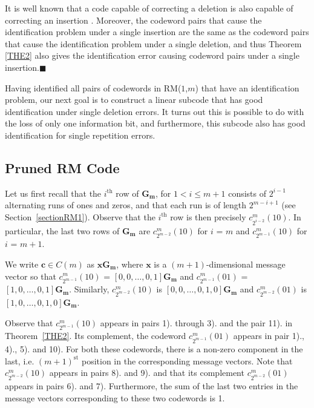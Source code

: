 \begin{remark}
It is well known that a code capable of correcting a deletion is
also capable of correcting an insertion \cite{lev:66}. Moreover,
the codeword pairs that cause the identification problem under a
single insertion are the same as the codeword pairs that cause the
identification problem under a single deletion, and thus Theorem
\ref{THE2} also gives the identification error causing codeword
pairs under a single insertion.\hfill$\blacksquare$
\end{remark}
Having identified all pairs of codewords in RM($1$,$m$) that have
an identification problem, our next goal is to construct a linear
subcode that has good identification under single deletion errors.
It turns out this is possible to do with the loss of only one
information bit, and furthermore, this subcode also has good
identification for single repetition errors.

\subsection{Pruned RM Code}\label{sectionprun}

Let us first recall that the $i^{\text{th}}$ row of $\mathbf{G_m}$,
for $1 <i \leq m+1$ consists of $2^{i-1}$ alternating runs of ones
and zeros, and that each run is of length $2^{m-i+1}$ (see
Section~\ref{sectionRM1}). Observe that the $i^{\text{th}}$ row is
then precisely $c_{2^{i-2}}^m(10)$. In particular, the last two rows
of $\mathbf{G_m}$ are $c_{2^{m-2}}^m(10)$ for $i$ = $m$ and
$c_{2^{m-1}}^m(10)$ for $i$ = $m+1$.

We write $\mathbf{c} \in C(m)$ as $\mathbf{x} \mathbf{G_m}$, where
$\mathbf{x}$ is a $(m+1)$-dimensional message vector so that
$c_{2^{m-1}}^m(10)$ = $[0,0,\ldots,0,1] \mathbf{G_m}$ and
$c_{2^{m-1}}^m(01)$ = $[1,0,\ldots,0,1] \mathbf{G_m}$. Similarly,
$c_{2^{m-2}}^m(10)$ is $[0,0,\ldots,0,1,0] \mathbf{G_m}$ and
$c_{2^{m-2}}^m(01)$ is $[1,0,\ldots,0,1,0] \mathbf{G_m}$.

Observe that $c_{2^{m-1}}^m(10)$ appears in pairs 1). through 3).
and the pair 11). in Theorem~\ref{THE2}. Its complement, the
codeword $c_{2^{m-1}}^m(01)$ appears in pair 1)., 4)., 5). and
10). For both these codewords, there is a non-zero component in
the last, i.e. $(m+1)^{\text{st}}$ position in the corresponding
message vectors. Note that $c_{2^{m-2}}^m(10)$ appears in pairs
8). and 9). and that its complement $c_{2^{m-2}}^m(01)$ appears in
pairs 6). and 7). Furthermore, the sum of the last two entries in
the message vectors corresponding to these two codewords is 1.

